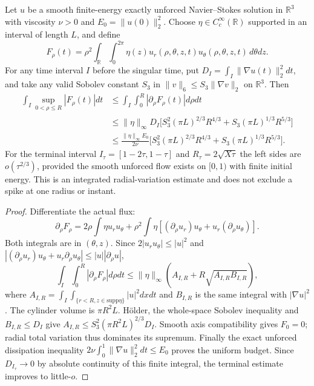 \begin{theorem}
\label{thm:xli-BV}
Let $u$ be a smooth finite-energy exactly unforced Navier--Stokes
solution in $\mathbb R^3$ with viscosity $\nu>0$ and
$E_0=\|u(0)\|_2^2$. Choose $\eta\in C_c^\infty(\mathbb R)$
supported in an interval of length $L$, and define
\[
F_\rho(t)=\rho^2\int_{\mathbb R}\int_0^{2\pi}
\eta(z)u_r(\rho,\theta,z,t)u_\theta(\rho,\theta,z,t)\,
d\theta dz.
\]
For any time interval $I$ before the singular time, put
$D_I=\int_I\|\nabla u(t)\|_2^2dt$, and take any valid
Sobolev constant $S_3$ in
$\|v\|_6\le S_3\|\nabla v\|_2$ on $\mathbb R^3$.
Then
\begin{equation}\label{eq:xli-BV}
\boxed{\begin{aligned}
\int_I\sup_{0<\rho\le R}|F_\rho(t)|dt
&\le\int_I\int_0^R|\partial_\rho F_\rho(t)|d\rho dt\\
&\le \|\eta\|_\infty D_I
\bigl[S_3^2(\pi L)^{2/3}R^{4/3}
 +S_3(\pi L)^{1/3}R^{5/3}\bigr]\\
&\le\frac{\|\eta\|_\infty E_0}{2\nu}
\bigl[S_3^2(\pi L)^{2/3}R^{4/3}
 +S_3(\pi L)^{1/3}R^{5/3}\bigr].
\end{aligned}}
\end{equation}
For the terminal interval $I_\tau=[1-2\tau,1-\tau]$
and $R_\tau=2\sqrt{X\tau}$ the left sides are
$o(\tau^{2/3})$, provided the smooth unforced
flow exists on $[0,1)$ with finite initial energy.
This is an integrated radial-variation estimate and
does not exclude a spike at one radius or instant.
\end{theorem}
\begin{proof}
Differentiate the actual flux:
\[
\partial_\rho F_\rho=
2\rho\int\eta u_ru_\theta+
\rho^2\int\eta[(\partial_\rho u_r)u_\theta+
u_r(\partial_\rho u_\theta)].
\]
Both integrals are in $(\theta,z)$.
Since $2|u_ru_\theta|\le |u|^2$ and
$|(\partial_\rho u_r)u_\theta+
u_r\partial_\rho u_\theta|\le
|u||\partial_\rho u|$,
\[
\int_I\int_0^R|\partial_\rho F_\rho|d\rho dt
\le \|\eta\|_\infty
(A_{I,R}+R\sqrt{A_{I,R}B_{I,R}}),
\]
where $A_{I,R}=\int_I\int_{\{r<R,z\in\mathrm{supp}\eta\}}
|u|^2dxdt$ and $B_{I,R}$ is the same integral
with $|\nabla u|^2$. The cylinder volume is
$\pi R^2L$. H\"older, the whole-space Sobolev
inequality and $B_{I,R}\le D_I$ give
$A_{I,R}\le S_3^2(\pi R^2L)^{2/3}D_I$.
Smooth axis compatibility gives $F_0=0$;
radial total variation thus dominates its supremum.
Finally the exact unforced dissipation inequality
$2\nu\int_0^1\|\nabla u\|_2^2dt\le E_0$
proves the uniform budget. Since
$D_{I_\tau}\to0$ by absolute continuity of
this finite integral, the terminal estimate
improves to little-$o$.
\end{proof}

